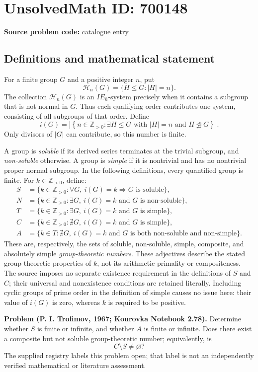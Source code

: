 \documentclass[11pt]{article}
\newcommand{\Z}{\mathbb{Z}}
\begin{document}
\section*{UnsolvedMath ID: 700148}
\textbf{Source problem code:} catalogue entry
\subsection{Definitions and mathematical statement}
For a finite group \(G\) and a positive integer \(n\), put
\[
\mathcal H_n(G)=\{H\leq G:|H|=n\}.
\]
The collection \(\mathcal H_n(G)\) is an \(IE_{\bar n}\)-system precisely when it contains a subgroup that is not normal in \(G\). Thus each qualifying order contributes one system, consisting of all subgroups of that order. Define
\[
i(G)=\left|\left\{n\in\Z_{>0}:\exists H\leq G\text{ with }|H|=n\text{ and }H\not\trianglelefteq G\right\}\right|.
\]
Only divisors of \(|G|\) can contribute, so this number is finite.

A group is \emph{soluble} if its derived series terminates at the trivial subgroup, and \emph{non-soluble} otherwise. A group is \emph{simple} if it is nontrivial and has no nontrivial proper normal subgroup. In the following definitions, every quantified group is finite. For \(k\in\Z_{>0}\), define:
\begin{align*}
S&=\{k\in\Z_{>0}:\forall G,\ i(G)=k\Longrightarrow G\text{ is soluble}\},\\
N&=\{k\in\Z_{>0}:\exists G,\ i(G)=k\text{ and }G\text{ is non-soluble}\},\\
T&=\{k\in\Z_{>0}:\exists G,\ i(G)=k\text{ and }G\text{ is simple}\},\\
C&=\{k\in\Z_{>0}:\nexists G,\ i(G)=k\text{ and }G\text{ is simple}\},\\
A&=\bigl\{k\in T:\nexists G,\ i(G)=k\text{ and }G\text{ is both non-soluble and non-simple}\bigr\}.
\end{align*}
These are, respectively, the sets of soluble, non-soluble, simple, composite, and absolutely simple \emph{group-theoretic numbers}. These adjectives describe the stated group-theoretic properties of \(k\), not its arithmetic primality or compositeness. The source imposes no separate existence requirement in the definitions of \(S\) and \(C\); their universal and nonexistence conditions are retained literally. Including cyclic groups of prime order in the definition of simple causes no issue here: their value of \(i(G)\) is zero, whereas \(k\) is required to be positive.

\textbf{Problem (P. I. Trofimov, 1967; Kourovka Notebook 2.78).} Determine whether \(S\) is finite or infinite, and whether \(A\) is finite or infinite. Does there exist a composite but not soluble group-theoretic number; equivalently, is
\[
C\setminus S\neq\varnothing?
\]
The supplied registry labels this problem open; that label is not an independently verified mathematical or literature assessment.
\end{document}
